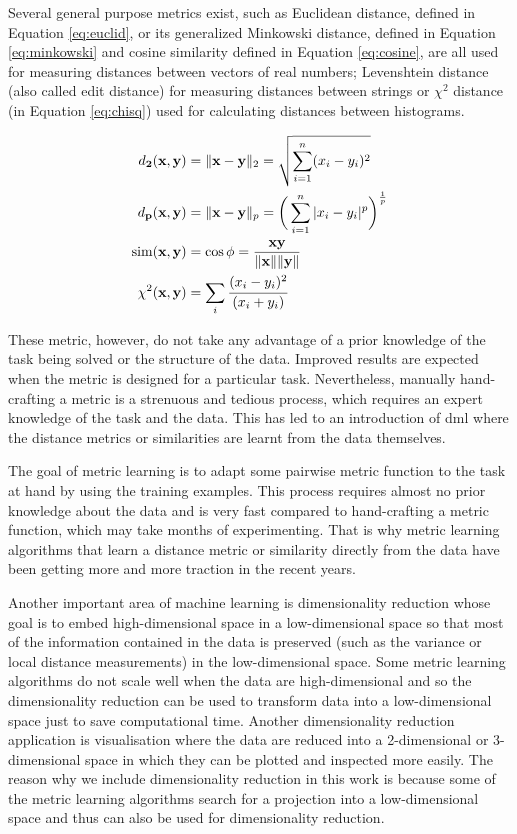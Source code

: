 \documentclass[12pt,a4paper]{report}
\begin{document}
Several general purpose metrics exist, such as Euclidean distance, defined in Equation \ref{eq:euclid}, or its generalized Minkowski distance, defined in Equation \ref{eq:minkowski} and cosine similarity defined in Equation \ref{eq:cosine}, are all used for measuring distances between vectors of real numbers; Levenshtein distance (also called edit distance) for measuring distances between strings or $\chi^2$ distance (in Equation \ref{eq:chisq}) used for calculating distances between histograms.

\begin{align}
d_{\mathbf{2}}(\textbf{x}, \textbf{y}) &= \|\textbf{x}-\textbf{y}\|_2 = \sqrt{\sum_{i=1}^{n} (x_i-y_i)^2} \label{eq:euclid} \\
d_{\mathbf{p}}(\textbf{x}, \textbf{y}) &= \|\textbf{x}-\textbf{y}\|_p = \bigg(\sum_{i=1}^{n} |x_i-y_i|^p\bigg)^\frac{1}{p} \label{eq:minkowski} \\
\mathrm{sim}(\textbf{x}, \textbf{y}) &= \cos{\phi} = \frac{\textbf{x}\textbf{y}}{\|\textbf{x}\|\|\textbf{y}\|} \label{eq:cosine} \\
\chi^2(\textbf{x}, \textbf{y}) &= \sum_{i} \cfrac{(x_i - y_i)^2} {(x_i + y_i)} \label{eq:chisq}
\end{align}

These metric, however, do not take any advantage of a prior knowledge of the task being solved or the structure of the data. Improved results are expected when the metric is designed for a particular task. Nevertheless, manually hand-crafting a metric is a strenuous and tedious process, which requires an expert knowledge of the task and the data. This has led to an introduction of \ac{dml} where the distance metrics or similarities are learnt from the data themselves.

The goal of metric learning is to adapt some pairwise metric function to the task at hand by using the training examples. This process requires almost no prior knowledge about the data and is very fast compared to hand-crafting a metric function, which may take months of experimenting. That is why metric learning algorithms that learn a distance metric or similarity directly from the data have been getting more and more traction in the recent years.

Another important area of machine learning is dimensionality reduction whose goal is to embed high-dimensional space in a low-dimensional space so that most of the information contained in the data is preserved (such as the variance or local distance measurements) in the low-dimensional space. Some metric learning algorithms do not scale well when the data are high-dimensional and so the dimensionality reduction can be used to transform data into a low-dimensional space just to save computational time. Another dimensionality reduction application is visualisation where the data are reduced into a 2-dimensional or 3-dimensional space in which they can be plotted and inspected more easily. The reason why we include dimensionality reduction in this work is because some of the metric learning algorithms search for a projection into a low-dimensional space and thus can also be used for dimensionality reduction.
\end{document}
